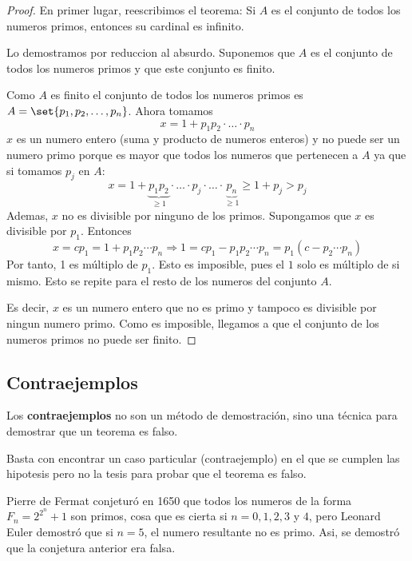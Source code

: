 \begin{proof}
	En primer lugar, reescribimos el teorema: Si \(A \) es el conjunto de todos los numeros primos, entonces su cardinal es infinito.
	
	Lo demostramos por reduccion al absurdo. Suponemos que \(A \) es el conjunto de todos los numeros primos y que este conjunto es finito.
	
	Como \(A \) es finito el conjunto de todos los numeros primos es \(A = \set{p_1,p_2,\ldots,p_n}\). Ahora tomamos
	\[
		x = 1 + p_1 p_2 \cdot \ldots \cdot p_n
	\]
	\(x \) es un numero entero (suma y producto de numeros enteros) y no puede ser un numero primo porque es mayor que todos los numeros que pertenecen a \(A \) ya que si tomamos \(p_j \) en \(A \):
	\[x = 1 + \underbrace{p_1 p_2}_{\geq 1} \cdot \ldots \cdot p_j \cdot \ldots \cdot \underbrace{p_n}_{\geq 1} \geq 1 + p_j > p_j\]
	Ademas, \(x\) no es divisible por ninguno de los primos. Supongamos que \(x \) es divisible por \(p_1\). Entonces \[x = c p_1 = 1 + p_1 p_2 \cdots p_n \Rightarrow 1 = c p_1 - p_1 p_2 \cdots p_n = p_1 (c - p_2 \cdots p_n )\]
	Por tanto, 1 es múltiplo de \(p_1 \). Esto es imposible, pues el \(1 \) solo es múltiplo de si mismo. Esto se repite para el resto de los numeros del conjunto \(A \).
	
	Es decir, \(x \) es un numero entero que no es primo y tampoco es divisible por ningun numero primo. Como es imposible, llegamos a que el conjunto de los numeros primos no puede ser finito.
\end{proof}

\subsection{Contraejemplos}

Los \textbf{contraejemplos} no son un método de demostración, sino una técnica para demostrar que un teorema es falso.

Basta con encontrar un caso particular (contraejemplo) en el que se cumplen las hipotesis pero no la tesis para probar que el teorema es falso.

\begin{example}
	Pierre de Fermat conjeturó en 1650 que todos los numeros de la forma \(F_n = 2^{2^{n} } + 1 \) son primos, cosa que es cierta si \(n =0,1,2,3\) y \(4 \), pero Leonard Euler demostró que si \(n=5\), el numero resultante no es primo. Asi, se demostró que la conjetura anterior era falsa.
\end{example}

